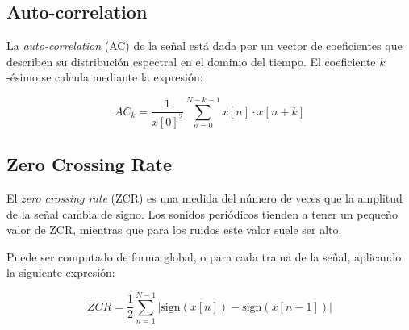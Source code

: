 \subsection{Auto-correlation}\label{subsec:auto-correlation}

La \textit{auto-correlation} (AC) de la señal está dada por un vector de coeficientes que describen su distribución espectral en el dominio del tiempo.
El coeficiente $k$-ésimo se calcula mediante la expresión:

\begin{equation}
    \label{eq:AC}
    AC_k = \frac{1}{x[0]^2}\sum_{n=0}^{N-k-1}{x[n]\cdot x[n+k]}
\end{equation}

\subsection{Zero Crossing Rate}\label{subsec:zeroCrossingRate}

El \textit{zero crossing rate} (ZCR) es una medida del número de veces que la amplitud de la señal cambia de signo.
Los sonidos periódicos tienden a tener un pequeño valor de ZCR, mientras que para los ruidos este valor suele ser alto.

Puede ser computado de forma global, o para cada trama de la señal, aplicando la siguiente expresión:

\begin{equation}
    \label{eq:ZCR}
    ZCR = \frac{1}{2}\sum_{n=1}^{N-1}{|\text{sign}(x[n]) - \text{sign}(x[n-1])|}
\end{equation}
